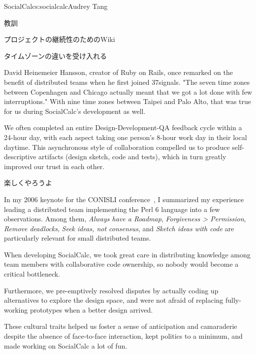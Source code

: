 \begin{aosachapter}{SocialCalc}{s:socialcalc}{Audrey Tang}
\begin{aosasect1}{教訓}
\begin{aosasect2}{プロジェクトの継続性のためのWiki}
\end{aosasect2}

\begin{aosasect2}{タイムゾーンの違いを受け入れる}

David Heinemeier Hansson, creator of Ruby on Rails, once remarked on
the benefit of distributed teams when he first joined 37signals. "The
seven time zones between Copenhagen and Chicago actually meant that
we got a lot done with few interruptions." With nine time zones
between Taipei and Palo Alto, that was true for us during
SocialCalc's development as well.

We often completed an entire Design-Development-QA feedback cycle
within a 24-hour day, with each aspect taking one person's 8-hour
work day in their local daytime.  This asynchronous style of
collaboration compelled us to produce self-descriptive artifacts
(design sketch, code and tests), which in turn greatly improved our
trust in each other.

\end{aosasect2}

\begin{aosasect2}{楽しくやろうよ}

In my 2006 keynote for the CONISLI conference~\cite{bib:tang:fun}, I
summarized my experience leading a distributed team implementing the
Perl 6 language into a few observations.  Among them, \emph{Always
 have a Roadmap}, \emph{Forgiveness {\textgreater} Permission},
\emph{Remove deadlocks}, \emph{Seek ideas, not consensus}, and
\emph{Sketch ideas with code} are particularly relevant for small
distributed teams.

When developing SocialCalc, we took great care in distributing
knowledge among team members with collaborative code ownership, so
nobody would become a critical bottleneck.

Furthermore, we pre-emptively resolved disputes by actually coding up
alternatives to explore the design space, and were not afraid of
replacing fully-working prototypes when a better design arrived.

These cultural traits helped us foster a sense of anticipation and
camaraderie despite the absence of face-to-face interaction, kept
politics to a minimum, and made working on SocialCalc a lot of fun.

\end{aosasect2}


\end{aosasect1}
\end{aosachapter}
